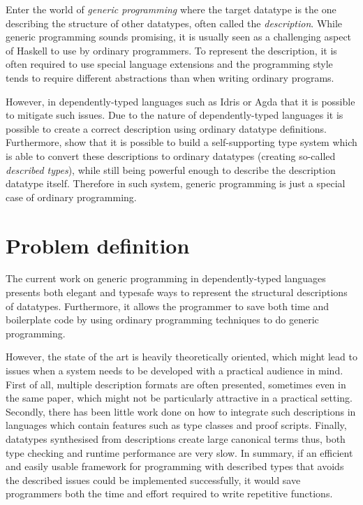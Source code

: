 \documentclass{ituthesis}
\begin{document}
Enter the world of \textit{generic programming} where the target datatype is the one describing the structure of other datatypes, often called the \textit{description}.
While generic programming sounds promising, it is usually seen as a challenging aspect of Haskell to use by ordinary programmers. To represent the description, it is often required to use special language extensions and the programming style tends to require different abstractions than when writing ordinary programs.

However, in dependently-typed languages such as Idris or Agda that it is possible to mitigate such issues.
Due to the nature of dependently-typed languages it is possible to create a correct description using ordinary datatype definitions.
Furthermore, \cite{Chapman:2010:GAL:1863543.1863547} show that it is possible to build a self-supporting type system which is able to convert these descriptions to ordinary datatypes (creating so-called \textit{described types}), while still being powerful enough to describe the description datatype itself.
Therefore in such system, generic programming is just a special case of ordinary programming.



\section{Problem definition}
\label{sec:ProblemDefinition}
The current work on generic programming in dependently-typed languages presents both elegant and typesafe ways to represent the structural descriptions of datatypes. Furthermore, it allows the programmer to save both time and boilerplate code by using ordinary programming techniques to do generic programming.

However, the state of the art is heavily theoretically oriented, which might lead to issues when a system needs to be developed with a practical audience in mind.
First of all, multiple description formats are often presented, sometimes even in the same paper, which might not be particularly attractive in a practical setting.
Secondly, there has been little work done on how to integrate such descriptions in languages which contain features such as type classes and proof scripts.
Finally, datatypes synthesised from descriptions create large canonical terms thus, both type checking and runtime performance are very slow.
In summary, if an efficient and easily usable framework for programming with described types that avoids the described issues could be implemented successfully, it would save programmers both the time and effort required to write repetitive functions.
\end{document}
